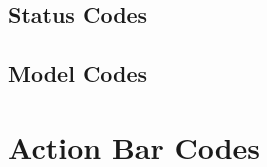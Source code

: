 \documentclass[11pt
  , a4paper
  , article
  , oneside
  , showtrims
]{memoir}
\begin{document}
\newpage
\section{Status Codes}
\vspace{1cm}



\newpage
\section{Model Codes}
\vspace{1cm}



\newpage
\chapter{Action Bar Codes}
\vspace{1cm}

\end{document}
